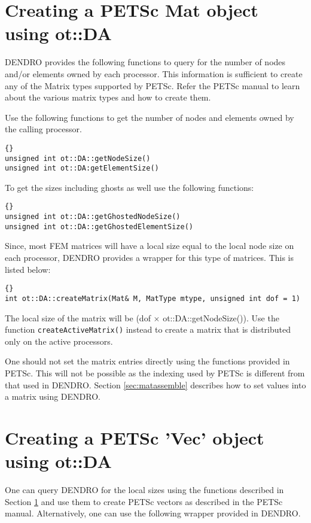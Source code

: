 \documentclass[10pt,reqno,a4paper]{report}
\numberwithin{equation}{section}
\begin{document}
\section{Creating a PETSc Mat object using ot::DA}
\label{sec:matcreate}
DENDRO provides the following functions to query for the number of nodes and/or elements owned by each processor. This information is sufficient to create any of the Matrix types supported by PETSc. Refer the PETSc manual to learn about the various matrix types and how to create them.

Use the following functions to get the number of nodes and elements owned by the calling processor.

\begin{lstlisting}[frame=trbl, fontadjust]{}
unsigned int ot::DA::getNodeSize()
unsigned int ot::DA:getElementSize()
\end{lstlisting}

To get the sizes including ghosts as well use the following functions:

\begin{lstlisting}[frame=trbl, fontadjust]{}
unsigned int ot::DA::getGhostedNodeSize()
unsigned int ot::DA::getGhostedElementSize()
\end{lstlisting}

Since, most FEM matrices will have a local size equal to the local node size on each processor, DENDRO provides a wrapper for this type of matrices. This is listed below:

\begin{lstlisting}[frame=trbl, fontadjust]{}
int ot::DA::createMatrix(Mat& M, MatType mtype, unsigned int dof = 1)
\end{lstlisting}
The local size of the matrix will be (dof $\times$ ot::DA::getNodeSize()). Use the function \lstinline[basicstyle=\bfseries]!createActiveMatrix()! instead to create a matrix
 that is distributed only on the active processors.

One should not set the matrix entries directly using the functions provided in PETSc. This will not be possible as the indexing used by PETSc is different from that used in DENDRO. Section \ref{sec:matassemble} describes how to set values into a matrix using DENDRO.

\section{Creating a PETSc 'Vec' object using ot::DA}
\label{sec:petscveccreate}
One can query DENDRO for the local sizes using the functions described in Section \ref{sec:matcreate} and use them to create PETSc vectors as described in the PETSc manual. Alternatively, one can use the following wrapper provided in DENDRO.
\end{document}
